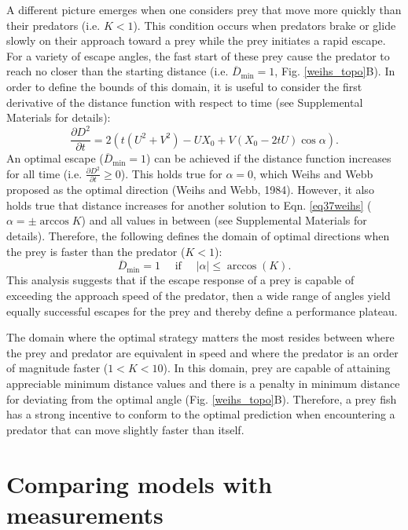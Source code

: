 \documentclass[12pt]{article}
\def\d{\partial}
\newcommand{\ol}{\overline}
\begin{document}
A different picture emerges when one considers prey that move more quickly than their predators (i.e. $K<1$). This condition occurs when predators brake or glide slowly on their approach toward a prey \citep{Higham:2007go, Higham:2005iu} while the prey initiates a rapid escape. 
For a variety of escape angles, the fast start of these prey cause the predator to reach no closer than the starting distance (i.e. $\ol D_{\text{min}}=1$, Fig. \ref{weihs_topo}B). In order to define the bounds of this domain, it is useful to consider the first derivative of the distance function with respect to time (see Supplemental Materials for details):
%
\begin{equation}
\frac{\d D^2}{\d t}= 2(t(U^2+V^2) - UX_0 + V(X_0-2tU)\cos\alpha).
\label{distderivative}
\end{equation}  
%
An optimal escape ($\ol D_{\text{min}}=1$) can be achieved if the distance function increases for all time (i.e. $\frac{\d D^2}{\d t}\geq0$). This holds true for $\alpha=0$, which Weihs and Webb proposed as the optimal direction (Weihs and Webb, 1984). 
However, it also holds true that distance increases for another solution to Eqn. \ref{eq37weihs} ($\alpha= \pm \arccos K$) and all values in between (see Supplemental Materials for details). Therefore, the following defines the domain of optimal directions when the prey is faster than the predator ($K<1$):
%
\begin{equation}
\ol D_{\text{min}}=1 \quad \text{ if } \quad  | \alpha |  \leq \arccos(K).
\label{anglerange}
\end{equation}
%
This analysis suggests that if the escape response of a prey is capable of exceeding the approach speed of the predator, then a wide range of angles yield equally successful escapes for the prey and thereby define a performance plateau. 

The domain where the optimal strategy matters the most resides between where the prey and predator are equivalent in speed and where the predator is an order of magnitude faster ($1<K<10$). 
In this domain, prey are capable of attaining appreciable minimum distance values and there is a penalty in minimum distance for deviating from the optimal angle (Fig. \ref{weihs_topo}B). 
Therefore, a prey fish has a strong incentive to conform to the optimal prediction when encountering a predator that can move slightly faster than itself.


\section{Comparing models with measurements}
\end{document}

